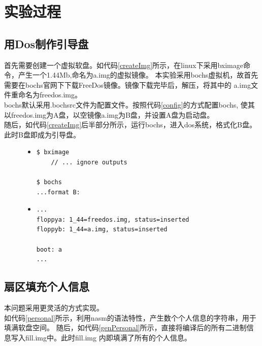 \documentclass[a4paper]{article}
\newcommand{\codev}[1]{\textsf{#1}}
\begin{document}
\section{实验过程}
\subsection{用Dos制作引导盘}
首先需要创建一个虚拟软盘。如代码\ref{createImg}所示，在linux下采用bximage命令，产生一个1.44Mb,命名为\codev{a.img}的虚拟镜像。
本实验采用bochs虚拟机，故首先需要在bochs官网下下载FreeDos镜像。镜像下载完毕后，解压，将其中的
\codev{a.img}文件重命名为\codev{freedos.img}。\\

bochs默认采用\codev{.bochsrc}文件为配置文件。按照代码\ref{config}的方式配置bochs,
使其以freedos.img为A盘，以空镜像a.img为B盘，并设置A盘为启动盘。\\

随后，如代码\ref{createImg}后半部分所示，运行bochs，进入dos系统，格式化B盘。此时B盘即成为引导盘。

\begin{figure}
\begin{itemize}
\item[] \begin{lstlisting}[language=sh, label=createImg, caption=创建虚拟软盘]
$ bximage
    // ... ignore outputs

$ bochs
...format B:
\end{lstlisting}
\end{itemize}
\end{figure}

\begin{figure}
\begin{itemize}
\item[] \begin{lstlisting}[label=config, caption=.bochsrc文件部分节选]
...
floppya: 1_44=freedos.img, status=inserted
floppyb: 1_44=a.img, status=inserted

boot: a
...
\end{lstlisting}
\end{itemize}
\end{figure}
\subsection{扇区填充个人信息}
本问题采用更灵活的方式实现。\\

如代码\ref{personal}所示，利用nasm的语法特性，产生数个个人信息的字符串，用于填满软盘空间。
随后，如代码\ref{genPersonal}所示，直接将编译后的所有二进制信息写入\codev{fill.img}中。此时\codev{fill.img}
内即填满了所有的个人信息。
\begin{figure}
\begin{itemize}
    \item[] Assembler}, label=personal, caption=来自fill.asm文件内容]{../../section2/fill.asm}
\end{itemize}
\end{figure}
\end{document}
